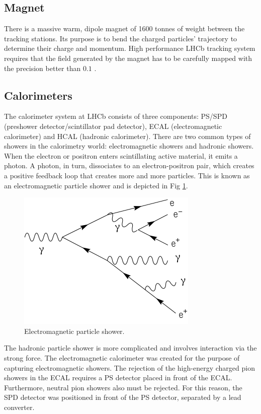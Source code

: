 \subsection{Magnet}

There is a massive warm, dipole magnet of 1600 tonnes of weight between the tracking stations. Its purpose is to bend the charged particles' trajectory to determine their charge and momentum.
High performance LHCb tracking system requires that the field generated by the magnet has to be carefully mapped with the precision better than $0.1$ \textperthousand.


\subsection{Calorimeters}
The calorimeter system at LHCb consists of three components: PS/SPD (preshower detector/scintillator pad detector), ECAL (electromagnetic calorimeter) and HCAL (hadronic calorimeter).
There are two common types of showers in the calorimetry world: electromagnetic showers and hadronic showers.
When the electron or positron enters scintillating active material, it emits a photon.
A photon, in turn, dissociates to an electron-positron pair, which creates a positive feedback loop that creates more and more particles.
This is known as an electromagnetic particle shower and is depicted in Fig \ref{fig:em_shower}.

\begin{figure}
  \centering
  \includegraphics[width=0.4\linewidth]{figures/chapter2/Schematic_of_a_particle_shower.svg.png}
  \caption[something]{Electromagnetic particle shower\footnotemark. }

  \label{fig:em_shower}
\end{figure}


The hadronic particle shower is more complicated and involves interaction via the strong force.
The electromagnetic calorimeter was created for the purpose of capturing electromagnetic showers.
The rejection of the high-energy charged pion showers in the ECAL requires a PS detector placed in front of the ECAL.
Furthermore, neutral pion showers also must be rejected. For this reason, the SPD detector was positioned in front of the PS detector, separated by a lead converter.

